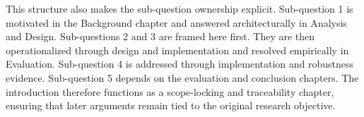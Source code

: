 This structure also makes the sub-question ownership explicit. Sub-question 1 is motivated in the Background chapter and answered architecturally in Analysis and Design. Sub-questions 2 and 3 are framed here first. They are then operationalized through design and implementation and resolved empirically in Evaluation. Sub-question 4 is addressed through implementation and robustness evidence. Sub-question 5 depends on the evaluation and conclusion chapters. The introduction therefore functions as a scope-locking and traceability chapter, ensuring that later arguments remain tied to the original research objective.

